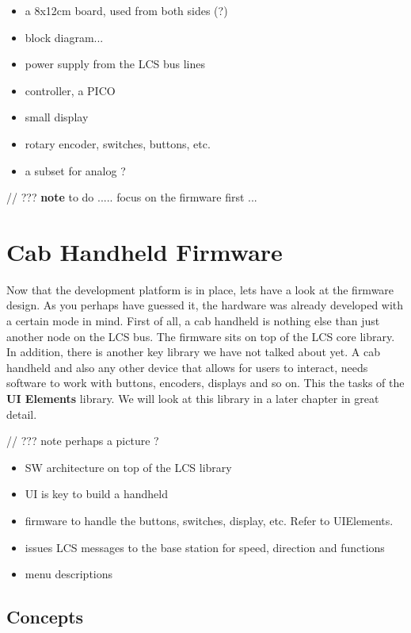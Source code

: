 \begin{itemize}
\item a 8x12cm board, used from both sides (?)
\item block diagram...
\item power supply from the LCS bus lines
\item controller, a PICO
\item small display
\item rotary encoder, switches, buttons, etc.
\item a subset for analog ?
\end{itemize}

// ??? \textbf{note} to do ..... focus on the firmware first ...

\section{Cab Handheld Firmware}

Now that the development platform is in place, lets have a look at the firmware design. As you perhaps have guessed it, the hardware was already developed with a certain mode in mind. First of all, a cab handheld is nothing else than just another node on the LCS bus. The firmware sits on top of the LCS core library. In addition, there is another key library we have not talked about yet. A cab handheld and also any other device that allows for users to interact, needs software to work with buttons, encoders, displays and so on. This the tasks of the \textbf{UI Elements } library. We will look at this library in a later chapter in great detail.

// ??? note perhaps a picture ?

\begin{itemize}
\item SW architecture on top of the LCS library
\item UI is key to build a handheld
\item firmware to handle the buttons, switches, display, etc. Refer to UIElements.
\item issues LCS messages to the base station for speed, direction and functions
\item menu descriptions
\end{itemize}

\subsection{Concepts}

